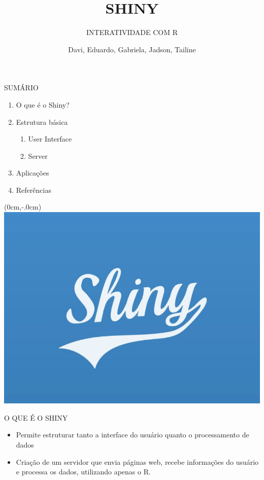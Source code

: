\documentclass[
  ignorenonframetext,
]{beamer}
\title{SHINY}
\subtitle{INTERATIVIDADE COM R}
\author{Davi, Eduardo, Gabriela, Jadson, Tailine}
\date{}
\begin{document}
\frame{\titlepage}

\begin{frame}{SUMÁRIO}
\protect\hypertarget{sumario}{}

\begin{enumerate}
\item O que é o Shiny?
\item Estrutura básica
\begin{enumerate}
\item User Interface
\item Server
\end{enumerate}
\item Aplicações
\item Referências
\end{enumerate}

\end{frame}

\begin{frame}{}
\protect\hypertarget{section}{}

\begin{textblock*}{0cm}(0cm,-.0cm)
\includegraphics[width=\paperwidth, height=\paperheight]{imagens/logo}
\end{textblock*}

\end{frame}

\begin{frame}{O QUE É O SHINY}
\protect\hypertarget{o-que-e-o-shiny}{}

\begin{itemize}
\item Permite estruturar tanto a interface do usuário quanto o processamento de dados
\item Criação de um servidor que envia páginas web, recebe informações do usuário e processa os dados, utilizando apenas o R.
\end{itemize}

\end{frame}
\end{document}
